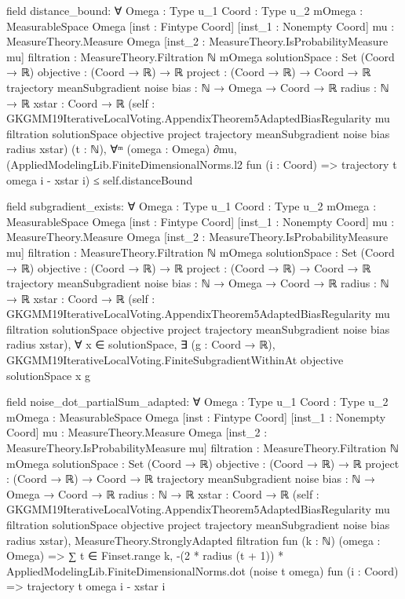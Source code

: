 \documentclass[10pt]{article}
\begin{document}
\begin{ReviewVerbatim}
field distance_bound:
∀ {Omega : Type u_1} {Coord : Type u_2} {mOmega : MeasurableSpace Omega} [inst : Fintype Coord]
  [inst_1 : Nonempty Coord] {mu : MeasureTheory.Measure Omega} [inst_2 : MeasureTheory.IsProbabilityMeasure mu]
  {filtration : MeasureTheory.Filtration ℕ mOmega} {solutionSpace : Set (Coord → ℝ)} {objective : (Coord → ℝ) → ℝ}
  {project : (Coord → ℝ) → Coord → ℝ} {trajectory meanSubgradient noise bias : ℕ → Omega → Coord → ℝ} {radius : ℕ → ℝ}
  {xstar : Coord → ℝ}
  (self :
    GKGMM19IterativeLocalVoting.AppendixTheorem5AdaptedBiasRegularity mu filtration solutionSpace objective project
      trajectory meanSubgradient noise bias radius xstar)
  (t : ℕ),
  ∀ᵐ (omega : Omega) ∂mu,
    (AppliedModelingLib.FiniteDimensionalNorms.l2 fun (i : Coord) => trajectory t omega i - xstar i) ≤
      self.distanceBound

field subgradient_exists:
∀ {Omega : Type u_1} {Coord : Type u_2} {mOmega : MeasurableSpace Omega} [inst : Fintype Coord]
  [inst_1 : Nonempty Coord] {mu : MeasureTheory.Measure Omega} [inst_2 : MeasureTheory.IsProbabilityMeasure mu]
  {filtration : MeasureTheory.Filtration ℕ mOmega} {solutionSpace : Set (Coord → ℝ)} {objective : (Coord → ℝ) → ℝ}
  {project : (Coord → ℝ) → Coord → ℝ} {trajectory meanSubgradient noise bias : ℕ → Omega → Coord → ℝ} {radius : ℕ → ℝ}
  {xstar : Coord → ℝ}
  (self :
    GKGMM19IterativeLocalVoting.AppendixTheorem5AdaptedBiasRegularity mu filtration solutionSpace objective project
      trajectory meanSubgradient noise bias radius xstar),
  ∀ x ∈ solutionSpace,
    ∃ (g : Coord → ℝ), GKGMM19IterativeLocalVoting.FiniteSubgradientWithinAt objective solutionSpace x g

field noise_dot_partialSum_adapted:
∀ {Omega : Type u_1} {Coord : Type u_2} {mOmega : MeasurableSpace Omega} [inst : Fintype Coord]
  [inst_1 : Nonempty Coord] {mu : MeasureTheory.Measure Omega} [inst_2 : MeasureTheory.IsProbabilityMeasure mu]
  {filtration : MeasureTheory.Filtration ℕ mOmega} {solutionSpace : Set (Coord → ℝ)} {objective : (Coord → ℝ) → ℝ}
  {project : (Coord → ℝ) → Coord → ℝ} {trajectory meanSubgradient noise bias : ℕ → Omega → Coord → ℝ} {radius : ℕ → ℝ}
  {xstar : Coord → ℝ}
  (self :
    GKGMM19IterativeLocalVoting.AppendixTheorem5AdaptedBiasRegularity mu filtration solutionSpace objective project
      trajectory meanSubgradient noise bias radius xstar),
  MeasureTheory.StronglyAdapted filtration fun (k : ℕ) (omega : Omega) =>
    ∑ t ∈ Finset.range k,
      -(2 * radius (t + 1)) *
        AppliedModelingLib.FiniteDimensionalNorms.dot (noise t omega) fun (i : Coord) => trajectory t omega i - xstar i
\end{ReviewVerbatim}
\end{document}
